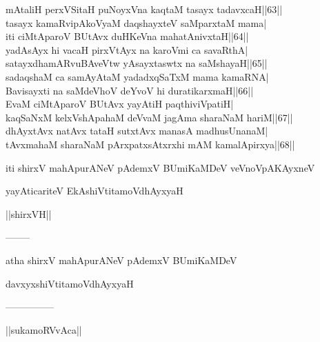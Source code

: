 \documentclass{article}
\begin{document}
mAtaliH perxVSitaH puNoyxVna kaqtaM tasayx tadavxcaH||63||\\
tasayx kamaRvipAkoVyaM daqshayxteV saMparxtaM mama|\\
iti ciMtAparoV BUtAvx duHKeVna mahatAnivxtaH||64||\\
yadAsAyx hi vacaH pirxVtAyx na karoVmi ca savaRthA|\\
satayxdhamARvuBAveVtw yAsayxtaswtx na saMshayaH||65||\\
sadaqshaM ca samAyAtaM yadadxqSaTxM mama kamaRNA|\\
Bavisayxti na saMdeVhoV deYvoV hi duratikarxmaH||66||\\
EvaM ciMtAparoV BUtAvx yayAtiH paqthiviVpatiH|\\
kaqSaNxM kelxVshApahaM deVvaM jagAma sharaNaM hariM||67||\\
dhAyxtAvx natAvx tataH sutxtAvx manasA madhusUnanaM|\\
tAvxmahaM sharaNaM pArxpatxsAtxrxhi mAM kamalApirxya||68||

\begin{center}
iti shirxV mahApurANeV pAdemxV BUmiKaMDeV veVnoVpAKAyxneV
\end{center}

\begin{center}
yayAticariteV EkAshiVtitamoVdhAyxyaH
\end{center}

\begin{center}
||shirxVH||
\end{center}

\begin{center}
--------
\end{center}

\begin{center}
atha shirxV mahApurANeV pAdemxV BUmiKaMDeV
\end{center}

\begin{center}
davxyxshiVtitamoVdhAyxyaH
\end{center}

\begin{center}

---------------
\end{center}

\begin{center}
||sukamoRVvAca||
\end{center}
\end{document}
